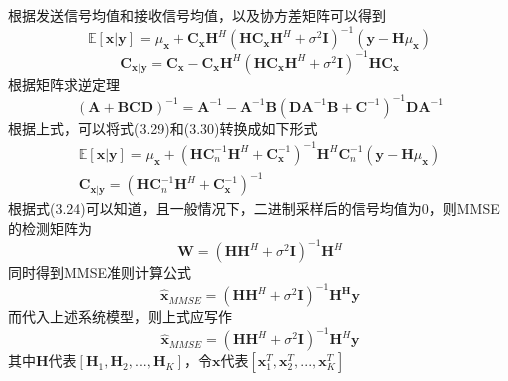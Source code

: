 \documentclass[bachelor,nocolorlinks, printoneside]{seuthesis} %
\begin{document}
\begin{Main}
\begin{equation}
\end{equation}
根据发送信号均值和接收信号均值，以及协方差矩阵可以得到
\begin{equation}\label{key}
\mathbb{E}[\mathbf{x}|\mathbf{y}]=\mu_{\mathbf{x}} + \mathbf{C}_{\mathbf{x}}\mathbf{H}^{H}(\mathbf{H}\mathbf{C}_{\mathbf{x}}\mathbf{H}^{H}+\sigma^{2}\mathbf{I})^{-1}(\mathbf{y}-\mathbf{H}\mu_{\mathbf{x}})
\end{equation}
\begin{equation}\label{key}
\mathbf{C}_{\mathbf{x}|\mathbf{y}}=\mathbf{C}_{\mathbf{x}}-\mathbf{C}_{\mathbf{x}}\mathbf{H}^{H}(\mathbf{H}\mathbf{C}_{\mathbf{x}}\mathbf{H}^{H}+\sigma^{2}\mathbf{I})^{-1}\mathbf{H}\mathbf{C}_{\mathbf{x}}
\end{equation}
根据矩阵求逆定理
\begin{equation}\label{key}
(\mathbf{A} + \mathbf{B}\mathbf{\mathbf{C}}\mathbf{D})^{-1} = \mathbf{A}^{-1} - \mathbf{A}^{-1}\mathbf{B}(\mathbf{D}\mathbf{A}^{-1}\mathbf{B}+\mathbf{\mathbf{C}}^{-1})^{-1}\mathbf{D}\mathbf{A}^{-1}
\end{equation}
根据上式，可以将式(3.29)和(3.30)转换成如下形式
\begin{gather}\label{key}
\mathbb{E}[\mathbf{x}|\mathbf{y}] = \mu_{\mathbf{x}} + (\mathbf{H}\mathbf{C}_n^{-1}\mathbf{H}^H + \mathbf{C}_\mathbf{x}^{-1})^{-1}\mathbf{H}^H \mathbf{C}_n^{-1}(\mathbf{y}-\mathbf{H}\mu_{\mathbf{x}}) \\ 
\mathbf{C}_{\mathbf{x}|\mathbf{y}} = (\mathbf{H} \mathbf{C}_n^{-1} \mathbf{H}^H + \mathbf{C}_\mathbf{x}^{-1})^{-1}
\end{gather}
根据式(3.24)可以知道，且一般情况下，二进制采样后的信号均值为0，则MMSE的检测矩阵为
\begin{equation}\label{key}
\mathbf{W} = ({\mathbf{H}}{\mathbf{H}}^H + \sigma^2 \mathbf{I})^{-1}{\mathbf{H}}^H
\end{equation}
同时得到MMSE准则计算公式
\begin{equation}\label{key}
\hat{\mathbf{x}}_{MMSE} = (\mathbf{H}\mathbf{H}^H + \sigma^2 \mathbf{I})^{-1}\mathbf{H}^\mathbf{H} \mathbf{y}
\end{equation}
而代入上述系统模型，则上式应写作
\begin{equation}\label{key}
\hat{\mathbf{x}}_{MMSE} = (\mathbf{H}\mathbf{H}^H + \sigma^2 \mathbf{I})^{-1}\mathbf{H}^H \mathbf{\mathbf{y}}
\end{equation}
其中$\mathbf{H}$代表$[\mathbf{H}_1,\mathbf{H}_2,...,\mathbf{H}_K]$，令$\mathbf{x}$代表$[\mathbf{x}_1^T,\mathbf{x}_2^T,...,\mathbf{x}_K^T]$



\end{Main}
\end{document}
